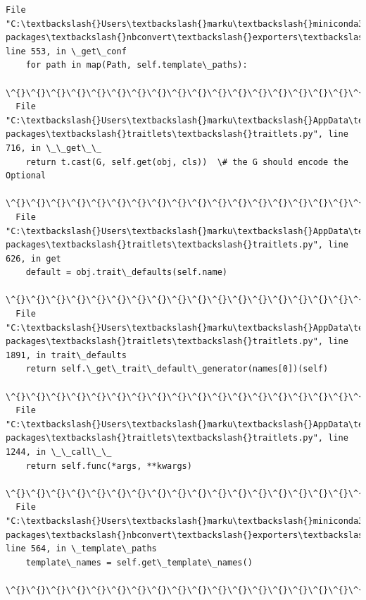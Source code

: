 \documentclass[11pt]{article}
\begin{document}
\begin{Verbatim}[commandchars=\\\{\}]
  File "C:\textbackslash{}Users\textbackslash{}marku\textbackslash{}miniconda3\textbackslash{}Lib\textbackslash{}site-
packages\textbackslash{}nbconvert\textbackslash{}exporters\textbackslash{}templateexporter.py", line 553, in \_get\_conf
    for path in map(Path, self.template\_paths):
                          \^{}\^{}\^{}\^{}\^{}\^{}\^{}\^{}\^{}\^{}\^{}\^{}\^{}\^{}\^{}\^{}\^{}\^{}\^{}
  File "C:\textbackslash{}Users\textbackslash{}marku\textbackslash{}AppData\textbackslash{}Roaming\textbackslash{}Python\textbackslash{}Python311\textbackslash{}site-
packages\textbackslash{}traitlets\textbackslash{}traitlets.py", line 716, in \_\_get\_\_
    return t.cast(G, self.get(obj, cls))  \# the G should encode the Optional
                     \^{}\^{}\^{}\^{}\^{}\^{}\^{}\^{}\^{}\^{}\^{}\^{}\^{}\^{}\^{}\^{}\^{}\^{}
  File "C:\textbackslash{}Users\textbackslash{}marku\textbackslash{}AppData\textbackslash{}Roaming\textbackslash{}Python\textbackslash{}Python311\textbackslash{}site-
packages\textbackslash{}traitlets\textbackslash{}traitlets.py", line 626, in get
    default = obj.trait\_defaults(self.name)
              \^{}\^{}\^{}\^{}\^{}\^{}\^{}\^{}\^{}\^{}\^{}\^{}\^{}\^{}\^{}\^{}\^{}\^{}\^{}\^{}\^{}\^{}\^{}\^{}\^{}\^{}\^{}\^{}\^{}
  File "C:\textbackslash{}Users\textbackslash{}marku\textbackslash{}AppData\textbackslash{}Roaming\textbackslash{}Python\textbackslash{}Python311\textbackslash{}site-
packages\textbackslash{}traitlets\textbackslash{}traitlets.py", line 1891, in trait\_defaults
    return self.\_get\_trait\_default\_generator(names[0])(self)
           \^{}\^{}\^{}\^{}\^{}\^{}\^{}\^{}\^{}\^{}\^{}\^{}\^{}\^{}\^{}\^{}\^{}\^{}\^{}\^{}\^{}\^{}\^{}\^{}\^{}\^{}\^{}\^{}\^{}\^{}\^{}\^{}\^{}\^{}\^{}\^{}\^{}\^{}\^{}\^{}\^{}\^{}\^{}\^{}\^{}\^{}\^{}\^{}\^{}
  File "C:\textbackslash{}Users\textbackslash{}marku\textbackslash{}AppData\textbackslash{}Roaming\textbackslash{}Python\textbackslash{}Python311\textbackslash{}site-
packages\textbackslash{}traitlets\textbackslash{}traitlets.py", line 1244, in \_\_call\_\_
    return self.func(*args, **kwargs)
           \^{}\^{}\^{}\^{}\^{}\^{}\^{}\^{}\^{}\^{}\^{}\^{}\^{}\^{}\^{}\^{}\^{}\^{}\^{}\^{}\^{}\^{}\^{}\^{}\^{}\^{}
  File "C:\textbackslash{}Users\textbackslash{}marku\textbackslash{}miniconda3\textbackslash{}Lib\textbackslash{}site-
packages\textbackslash{}nbconvert\textbackslash{}exporters\textbackslash{}templateexporter.py", line 564, in \_template\_paths
    template\_names = self.get\_template\_names()
                     \^{}\^{}\^{}\^{}\^{}\^{}\^{}\^{}\^{}\^{}\^{}\^{}\^{}\^{}\^{}\^{}\^{}\^{}\^{}\^{}\^{}\^{}\^{}\^{}\^{}

\end{Verbatim}
\end{document}
